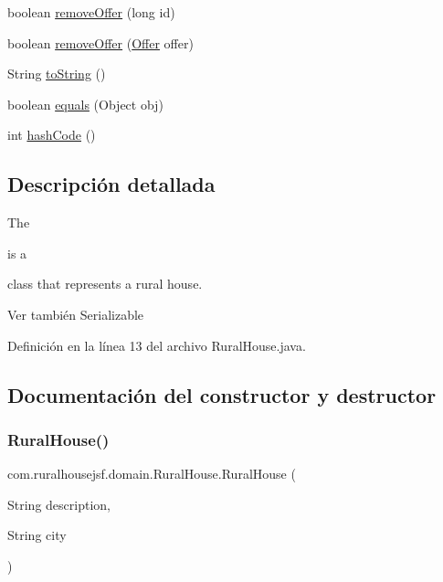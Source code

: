 \begin{DoxyCompactItemize}
boolean \mbox{\hyperlink{classcom_1_1ruralhousejsf_1_1domain_1_1_rural_house_ab6443a7d5fdef35c6a04110d497ddb16}{remove\+Offer}} (long id)
\item 
boolean \mbox{\hyperlink{classcom_1_1ruralhousejsf_1_1domain_1_1_rural_house_a36466194bda46f454c816aa5845c0d14}{remove\+Offer}} (\mbox{\hyperlink{classcom_1_1ruralhousejsf_1_1domain_1_1_offer}{Offer}} offer)
\item 
String \mbox{\hyperlink{classcom_1_1ruralhousejsf_1_1domain_1_1_rural_house_a33c5888213bc3b3f5a4d3c0015f9d033}{to\+String}} ()
\item 
boolean \mbox{\hyperlink{classcom_1_1ruralhousejsf_1_1domain_1_1_rural_house_affbd64026d988c58be52b7f7e5ebfbe8}{equals}} (Object obj)
\item 
int \mbox{\hyperlink{classcom_1_1ruralhousejsf_1_1domain_1_1_rural_house_a12fcb2ec3f802b71b5a1357622255b86}{hash\+Code}} ()
\end{DoxyCompactItemize}


\subsection{Descripción detallada}
The
\begin{DoxyCode}{0}
\end{DoxyCode}
 is a
\begin{DoxyCode}{0}
\end{DoxyCode}
 class that represents a rural house.

\begin{DoxySeeAlso}{Ver también}
Serializable 
\end{DoxySeeAlso}


Definición en la línea 13 del archivo Rural\+House.\+java.



\subsection{Documentación del constructor y destructor}
\mbox{\label{classcom_1_1ruralhousejsf_1_1domain_1_1_rural_house_aa3488a4d0e876307f91f80784a5538a5}} 
\subsubsection{\texorpdfstring{RuralHouse()}{RuralHouse()}\hspace{0.1cm}{\footnotesize\ttfamily [1/2]}}
{\footnotesize\ttfamily com.\+ruralhousejsf.\+domain.\+Rural\+House.\+Rural\+House (\begin{DoxyParamCaption}\item[{String}]{description,  }\item[{String}]{city }\end{DoxyParamCaption})}

